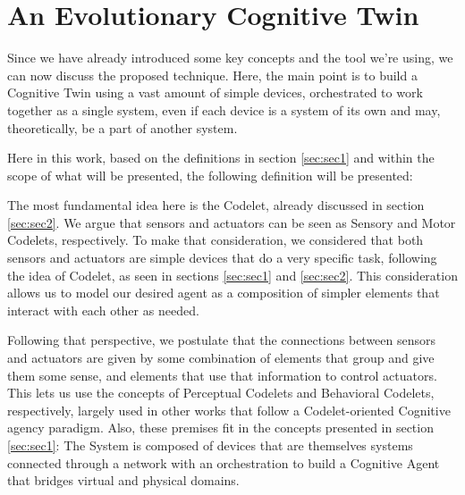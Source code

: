 \section{An Evolutionary Cognitive Twin}
\label{sec:sec3}

Since we have already introduced some key concepts and the tool we're using, we can now discuss the proposed technique. Here, the main point is to build a Cognitive Twin using a vast amount of simple devices, orchestrated to work together as a single system, even if each device is a system of its own and may, theoretically, be a part of another system.

Here in this work, based on the definitions in section \ref{sec:sec1} and within the scope of what will be presented, the following definition will be presented:

\noindent{}
\vspace{7mm}

The most fundamental idea here is the Codelet, already discussed in section \ref{sec:sec2}. We argue that sensors and actuators can be seen as Sensory and Motor Codelets, respectively. To make that consideration, we considered that both sensors and actuators are simple devices that do a very specific task, following the idea of Codelet, as seen in sections \ref{sec:sec1} and \ref{sec:sec2}. This consideration allows us to model our desired agent as a composition of simpler elements that interact with each other as needed.

Following that perspective, we postulate that the connections between sensors and actuators are given by some combination of elements that group and give them some sense, and elements that use that information to control actuators. This lets us use the concepts of Perceptual Codelets and Behavioral Codelets, respectively, largely used in other works that follow a Codelet-oriented Cognitive agency paradigm. Also, these premises fit in the concepts presented in section \ref{sec:sec1}: The System is composed of devices that are themselves systems connected through a network with an orchestration to build a Cognitive Agent that bridges virtual and physical domains.

